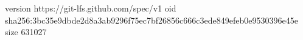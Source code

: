 version https://git-lfs.github.com/spec/v1
oid sha256:3bc35e9dbde2d8a3ab9296f75ec7bf26856c666c3ede849efeb0e9530396e45e
size 631027
